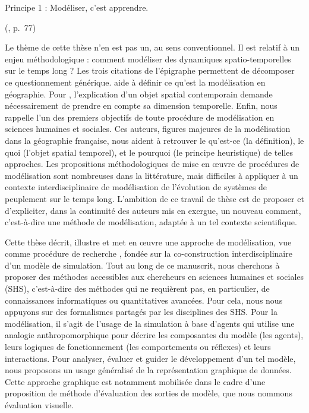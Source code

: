 \vspace*{-2.5em}\epigraph{
	\og Principe 1 : Modéliser, c'est apprendre\fg{}.
}{ (\citeyear{banos_pour_2013}, p.~77)}

Le \og thème\fg{} de cette thèse n'en est pas un, au sens conventionnel.
Il est relatif à un enjeu méthodologique : comment modéliser des dynamiques spatio-temporelles sur le temps long ?
Les trois citations de l'épigraphe permettent de décomposer ce questionnement générique.
 aide à définir ce qu'est la modélisation en géographie.
Pour , l'explication d'un objet spatial contemporain demande nécessairement de prendre en compte sa dimension temporelle.
Enfin,  nous rappelle l'un des premiers objectifs de toute procédure de modélisation en sciences humaines et sociales.
Ces auteurs, figures majeures de la modélisation dans la géographie française, nous aident à retrouver le \og qu'est-ce\fg{} (la définition), le \og quoi\fg{} (l'\og{}objet spatial\fg{} temporel), et le \og pourquoi\fg{} (le principe heuristique) de telles approches.
Les propositions méthodologiques de mise en œuvre de procédures de modélisation sont nombreuses dans la littérature, mais difficiles à appliquer à un contexte interdisciplinaire de modélisation de l'évolution de systèmes de peuplement sur le temps long.
L'ambition de ce travail de thèse est de proposer et d'expliciter, dans la continuité des auteurs mis en exergue, un nouveau \og comment\fg{}, c'est-à-dire une méthode de modélisation, adaptée à un tel contexte scientifique.

Cette thèse décrit, illustre et met en œuvre une approche de modélisation, vue comme \og procédure de recherche\fg{} \autocite{brunet2000modeles}, fondée sur la co-construction interdisciplinaire d'un modèle de simulation.
Tout au long de ce manuscrit, nous cherchons à proposer des méthodes accessibles aux chercheurs en sciences humaines et sociales (SHS), c'est-à-dire des méthodes qui ne requièrent pas, en particulier, de connaissances informatiques ou quantitatives avancées.
Pour cela, nous nous appuyons sur des formalismes partagés par les disciplines des SHS.
Pour la modélisation, il s'agit de l'usage de la simulation à base d'agents qui utilise une analogie anthropomorphique pour décrire les composantes du modèle (les agents), leurs logiques de fonctionnement (les comportements ou \og réflexes\fg{}) et leurs interactions.
Pour analyser, évaluer et guider le développement d'un tel modèle, nous proposons un usage généralisé de la représentation graphique de données.
Cette approche graphique est notamment mobilisée dans le cadre d'une proposition de méthode d'évaluation des sorties de modèle, que nous nommons \og évaluation visuelle\fg{}.

